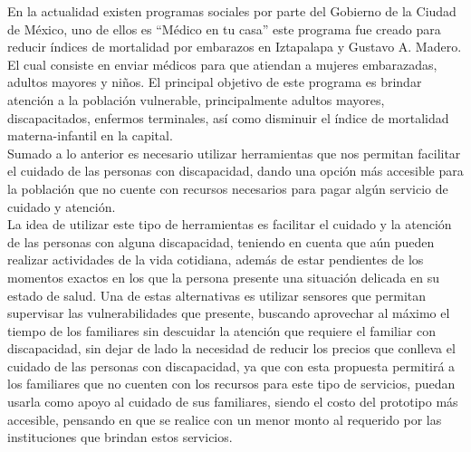 En la actualidad existen programas sociales por parte del Gobierno de la Ciudad de México, uno de ellos es “Médico en tu casa” este programa fue creado para reducir índices de mortalidad por embarazos en Iztapalapa y Gustavo A. Madero. El cual consiste en enviar médicos para que atiendan a mujeres embarazadas, adultos mayores y niños. El principal objetivo de este programa es brindar atención a la población vulnerable, principalmente adultos mayores, discapacitados, enfermos terminales, así como disminuir el índice de mortalidad materna-infantil en la capital. \\

Sumado a lo anterior es necesario utilizar herramientas que nos permitan facilitar el cuidado de las personas con discapacidad, dando una opción más accesible para la población que no cuente con recursos necesarios para pagar algún servicio de cuidado y atención. \\

La idea de utilizar este tipo de herramientas es facilitar el cuidado y la atención de las personas con alguna discapacidad, teniendo en cuenta que aún pueden realizar actividades de la vida cotidiana, además de estar pendientes de los momentos exactos en los que la persona presente una situación delicada en su estado de salud. Una de estas alternativas es utilizar sensores que permitan supervisar las vulnerabilidades que presente, buscando aprovechar al máximo el tiempo de los familiares sin descuidar la atención que requiere el familiar con discapacidad, sin dejar de lado la necesidad de reducir los precios que conlleva el cuidado de las personas con discapacidad, ya que con esta propuesta permitirá a los familiares que no cuenten con los recursos para este tipo de servicios, puedan usarla como apoyo al cuidado de sus familiares, siendo el costo del prototipo más accesible, pensando en que se realice con un menor monto al requerido por las instituciones que brindan estos servicios. \\



